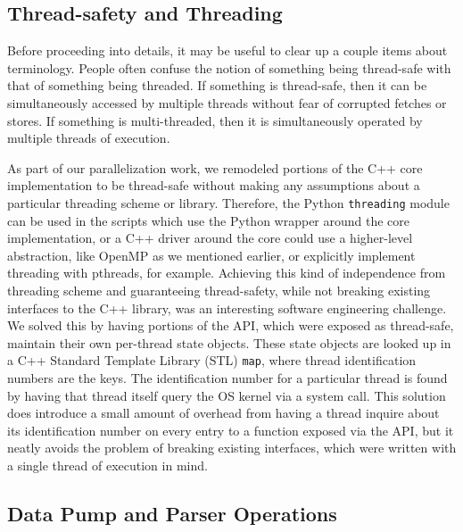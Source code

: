 \subsection{Thread-safety and Threading}

Before proceeding into details, it may be useful to clear up a couple items
about terminology. People often confuse the notion of something being
thread-safe with that of something being threaded. If something is thread-safe,
then it can be simultaneously accessed by multiple threads without fear of
corrupted fetches or stores. If something is multi-threaded, then it is
simultaneously operated by multiple threads of execution.

As part of our parallelization work, we remodeled portions of the C++ core
implementation to be thread-safe without making any assumptions about a
particular threading scheme or library. Therefore, the Python
\texttt{threading} module can be used in the scripts which use the Python
wrapper around the core implementation, or a C++ driver around the core could
use a higher-level abstraction, like OpenMP as we mentioned earlier, or
explicitly implement threading with pthreads, for example. Achieving this kind
of independence from threading scheme and guaranteeing thread-safety, while not
breaking existing interfaces to the C++ library, was an interesting software
engineering challenge. We solved this by having portions of the API, which were
exposed as thread-safe, maintain their own per-thread state objects. These
state objects are looked up in a C++ Standard Template Library (STL)
\texttt{map}, where thread identification numbers are the keys. The
identification number for a particular thread is found by having that thread
itself query the OS kernel via a system call. This solution does introduce a
small amount of overhead from having a thread inquire about its identification
number on every entry to a function exposed via the API, but it neatly avoids
the problem of breaking existing interfaces, which were written with a single
thread of execution in mind.

\subsection{Data Pump and Parser Operations}

